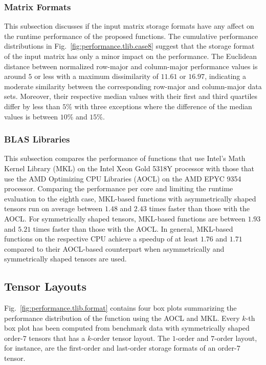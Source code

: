 \subsubsection{Matrix Formats}
This subsection discusses if the input matrix storage formats have any affect on the runtime performance of the proposed functions.
The cumulative performance distributions in Fig.~\ref{fig:performance.tlib.case8} suggest that the storage format of the input matrix has only a minor impact on the performance.
The Euclidean distance between normalized row-major and column-major performance values is around $5$ or less with a maximum dissimilarity of $11.61$ or $16.97$, indicating a moderate similarity between the corresponding row-major and column-major data sets.
Moreover, their respective median values with their first and third quartiles differ by less than $5$\% with three exceptions where the difference of the median values is between $10$\% and $15$\%.


\subsubsection{BLAS Libraries}
This subsection compares the performance of functions that use Intel's Math Kernel Library (MKL) on the Intel Xeon Gold 5318Y processor with those that use the AMD Optimizing CPU Libraries (AOCL) on the AMD EPYC 9354 processor. 
Comparing the performance per core and limiting the runtime evaluation to the eighth case, MKL-based functions with asymmetrically shaped tensors run on average between $1.48$ and $2.43$ times faster than those with the AOCL.
For symmetrically shaped tensors, MKL-based functions are between $1.93$ and $5.21$ times faster than those with the AOCL.
In general, MKL-based functions on the respective CPU achieve a speedup of at least $1.76$ and $1.71$ compared to their AOCL-based counterpart when asymmetrically and symmetrically shaped tensors are used.



\subsection{Tensor Layouts}
Fig.~\ref{fig:performance.tlib.format} contains four box plots summarizing the performance distribution of the  function using the AOCL and MKL.
Every $k$-th box plot has been computed from benchmark data with symmetrically shaped order-$7$ tensors that has a $k$-order tensor layout.
The $1$-order and $7$-order layout, for instance, are the first-order and last-order storage formats of an order-$7$ tensor.

